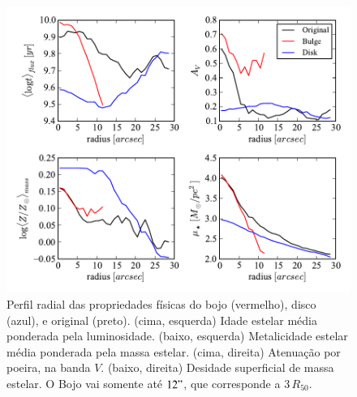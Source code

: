 \begin{figure}
	\includegraphics{figuras/decomp-at-aZ-AV-mu}
	\caption[Perfil radial das propriedades do bojo, disco, e total] {Perfil
	radial das propriedades físicas do bojo (vermelho), disco (azul), e original
	(preto). (cima, esquerda) Idade estelar média ponderada pela luminosidade.
	(baixo, esquerda) Metalicidade estelar média ponderada pela massa estelar.
	(cima, direita) Atenuação por poeira, na banda $V$. (baixo, direita) Desidade
	superficial de massa estelar. O Bojo vai somente até $12"$, que corresponde a
	$3\,R_{50}$.}
	\label{fig:decompSynRadprof}
\end{figure}

